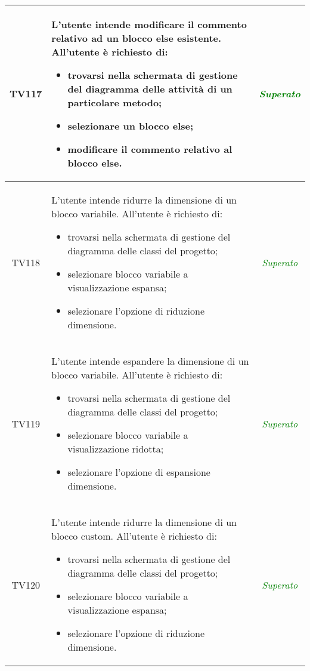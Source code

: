 \begin{longtable}{|c|>{}m{8cm}|c|}
\hypertarget{TV4.35.1}{TV117} & L'utente intende modificare il commento relativo ad un blocco else esistente.
All'utente è richiesto di:
\begin{itemize}
	\item trovarsi nella schermata di gestione del diagramma delle attività di un particolare metodo;
	\item selezionare un blocco else;
	\item modificare il commento relativo al blocco else.
\end{itemize} & \textcolor{Green}{\textit{Superato}}\\ \hline

\hypertarget{TV4.36}{TV118} & L'utente intende ridurre la dimensione di un blocco variabile.
All'utente è richiesto di:
\begin{itemize}
	\item trovarsi nella schermata di gestione del diagramma delle classi del progetto;
	\item selezionare blocco variabile a visualizzazione espansa;
	\item selezionare l'opzione di riduzione dimensione.
\end{itemize} & \textcolor{Green}{\textit{Superato}}\\ \hline

\hypertarget{TV4.37}{TV119} & L'utente intende espandere la dimensione di un blocco variabile.
All'utente è richiesto di:
\begin{itemize}
	\item trovarsi nella schermata di gestione del diagramma delle classi del progetto;
	\item selezionare blocco variabile a visualizzazione ridotta;
	\item selezionare l'opzione di espansione dimensione.
\end{itemize} & \textcolor{Green}{\textit{Superato}}\\ \hline

\hypertarget{TV4.38}{TV120} & L'utente intende ridurre la dimensione di un blocco custom.
All'utente è richiesto di:
\begin{itemize}
	\item trovarsi nella schermata di gestione del diagramma delle classi del progetto;
	\item selezionare blocco variabile a visualizzazione espansa;
	\item selezionare l'opzione di riduzione dimensione.
\end{itemize} & \textcolor{Green}{\textit{Superato}}\\ \hline


\end{longtable}
